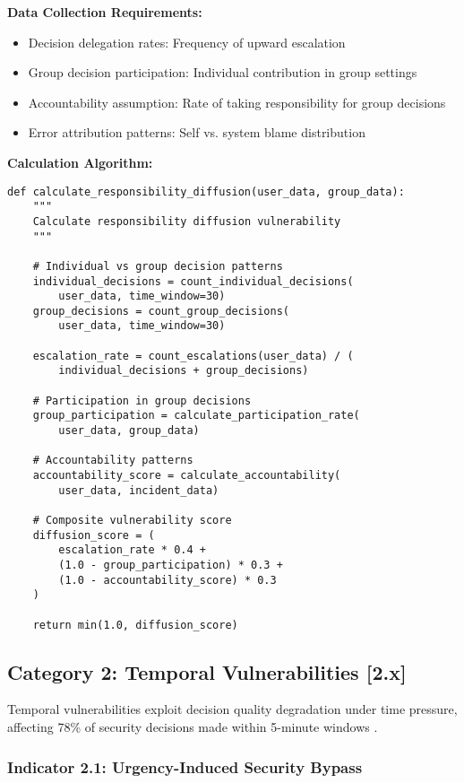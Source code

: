 \documentclass[10pt,twocolumn]{IEEEtran}
\begin{document}
\textbf{Data Collection Requirements:}
\begin{itemize}
\item Decision delegation rates: Frequency of upward escalation
\item Group decision participation: Individual contribution in group settings
\item Accountability assumption: Rate of taking responsibility for group decisions
\item Error attribution patterns: Self vs. system blame distribution
\end{itemize}

\textbf{Calculation Algorithm:}
\begin{lstlisting}[caption={Responsibility Diffusion Calculation}]
def calculate_responsibility_diffusion(user_data, group_data):
    """
    Calculate responsibility diffusion vulnerability
    """
    
    # Individual vs group decision patterns
    individual_decisions = count_individual_decisions(
        user_data, time_window=30)
    group_decisions = count_group_decisions(
        user_data, time_window=30)
    
    escalation_rate = count_escalations(user_data) / (
        individual_decisions + group_decisions)
    
    # Participation in group decisions
    group_participation = calculate_participation_rate(
        user_data, group_data)
    
    # Accountability patterns
    accountability_score = calculate_accountability(
        user_data, incident_data)
    
    # Composite vulnerability score
    diffusion_score = (
        escalation_rate * 0.4 +
        (1.0 - group_participation) * 0.3 +
        (1.0 - accountability_score) * 0.3
    )
    
    return min(1.0, diffusion_score)
\end{lstlisting}

\subsection{Category 2: Temporal Vulnerabilities [2.x]}

Temporal vulnerabilities exploit decision quality degradation under time pressure, affecting 78\% of security decisions made within 5-minute windows \cite{kahneman2011}.

\subsubsection{Indicator 2.1: Urgency-Induced Security Bypass}
\end{document}

